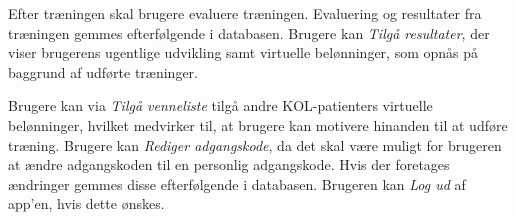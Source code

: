 Efter træningen skal brugere evaluere træningen. Evaluering og resultater fra træningen gemmes efterfølgende i databasen. Brugere kan \textit{Tilgå resultater}, der viser brugerens ugentlige udvikling samt virtuelle belønninger, som opnås på baggrund af udførte træninger. 

Brugere kan via \textit{Tilgå venneliste} tilgå andre KOL-patienters virtuelle belønninger, hvilket medvirker til, at brugere kan motivere hinanden til at udføre træning. Brugere kan \textit{Rediger adgangskode}, da det skal være muligt for brugeren at ændre adgangskoden til en personlig adgangskode. Hvis der foretages ændringer gemmes disse efterfølgende i databasen.
Brugeren kan \textit{Log ud} af app'en, hvis dette ønskes. 

%
%
%
%

